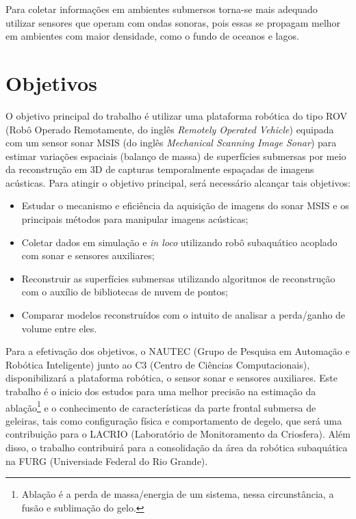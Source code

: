 Para coletar informações em ambientes submersos torna-se mais adequado utilizar sensores que operam com ondas sonoras, pois essas se propagam melhor em ambientes com maior densidade, como o fundo de oceanos e lagos.

\section{Objetivos}
\label{sec:objetivos}

O objetivo principal do trabalho é utilizar uma plataforma robótica do tipo ROV (Robô Operado Remotamente, do inglês \textit{Remotely Operated Vehicle}) equipada com um sensor sonar MSIS (do inglês \textit{Mechanical Scanning Image Sonar}) para estimar variações espaciais (balanço de massa) de superfícies submersas por meio da reconstrução em 3D de capturas temporalmente espaçadas de imagens acústicas. 
Para atingir o objetivo principal, será necessário alcançar tais objetivos:

\begin{itemize}
    \item Estudar o mecanismo e eficiência da aquisição de imagens do sonar MSIS e os principais métodos para manipular imagens acústicas;
    \item Coletar dados em simulação e \textit{in loco} utilizando robô subaquático acoplado com sonar e sensores auxiliares;
    \item Reconstruir as superfícies submersas utilizando algoritmos de reconstrução com o auxílio de bibliotecas de nuvem de pontos;
    \item Comparar modelos reconstruídos com o intuito de analisar a perda/ganho de volume entre eles. 
\end{itemize}
\hspace{1em}

Para a efetivação dos objetivos, o NAUTEC (Grupo de Pesquisa em Automação e Robótica Inteligente) junto ao C3 (Centro de Ciências Computacionais), disponibilizará a plataforma robótica, o sensor sonar e sensores auxiliares. Este trabalho é o inicio dos estudos para uma melhor precisão na estimação da ablação\footnote{Ablação é a perda de massa/energia de um sistema, nessa circunstância, a fusão e sublimação do gelo.} e o conhecimento de características da parte frontal submersa de geleiras, tais como configuração física e comportamento de degelo, que será uma contribuição para o LACRIO (Laboratório de Monitoramento da Criosfera). Além disso, o trabalho contribuirá para a consolidação da área da robótica subaquática na FURG (Universiade Federal do Rio Grande).

